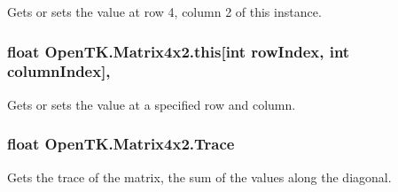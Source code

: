 Gets or sets the value at row 4, column 2 of this instance. 

\hypertarget{struct_open_t_k_1_1_matrix4x2_a1ab36f12b1574dcb316c6493065867a0}{
\subsubsection[{this[int row\-Index, int column\-Index]}]{\setlength{\rightskip}{0pt plus 5cm}float Open\-T\-K.\-Matrix4x2.\-this\mbox{[}int row\-Index, int column\-Index\mbox{]}\hspace{0.3cm}{\ttfamily [get]}, {\ttfamily [set]}}}\label{struct_open_t_k_1_1_matrix4x2_a1ab36f12b1574dcb316c6493065867a0}


Gets or sets the value at a specified row and column. 

\hypertarget{struct_open_t_k_1_1_matrix4x2_a1814341370f782758d972f5190084fa0}{
\subsubsection[{Trace}]{\setlength{\rightskip}{0pt plus 5cm}float Open\-T\-K.\-Matrix4x2.\-Trace\hspace{0.3cm}{\ttfamily [get]}}}\label{struct_open_t_k_1_1_matrix4x2_a1814341370f782758d972f5190084fa0}


Gets the trace of the matrix, the sum of the values along the diagonal. 

